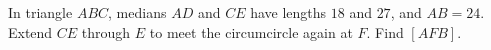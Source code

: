 In triangle $ABC$, medians $AD$ and $CE$ have lengths $18$ and $27$, and $AB=24$. Extend $CE$ through $E$ to meet the circumcircle again at $F$. Find $[AFB]$.
